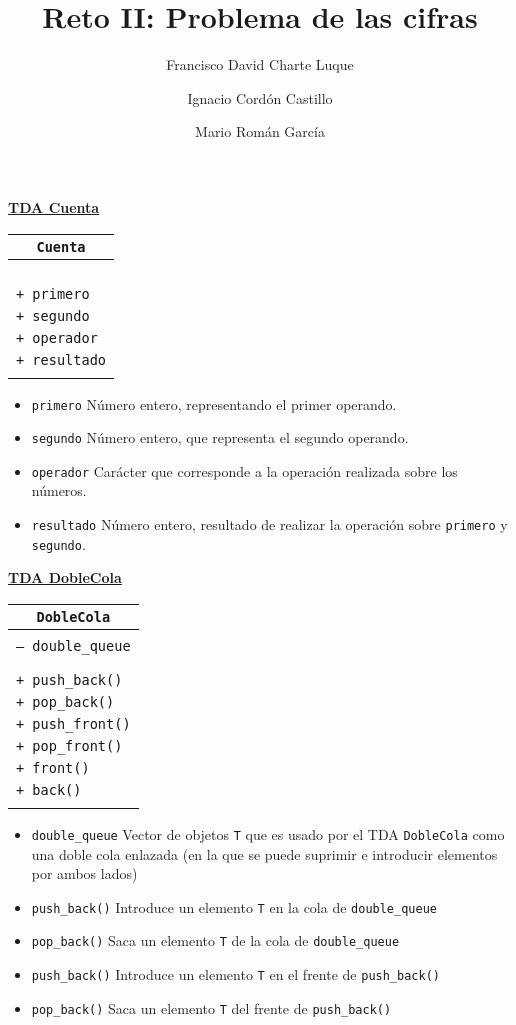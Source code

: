 \documentclass[a4paper,10pt]{scrartcl}
\title{Reto II: Problema de las cifras}
\author{Francisco David Charte Luque \and 
        Ignacio Cordón Castillo \and
        Mario Román García}
\date{}
\newcommand{\objeto}[4]{\noindent\underline{\textbf{TDA #1}}
            \begin{center}\begin{tabular}{|p{7cm}|}
                 \hline
                 \multicolumn{1}{|c|}{\texttt{#1}}\\
                 \hline
                  \\#2\\\\
                 \hline
                 \\#3\\\\
                 \hline
            \end{tabular}\end{center}
            \begin{itemize}
            #4
            \end{itemize}
               }
\def\C++#1{\texttt{#1}}
\def\T_{\texttt{T}}
\begin{document}
\maketitle

\objeto{Cuenta}{}{
        \C++{+ primero}\\
        \C++{+ segundo}\\
        \C++{+ operador}\\
        \C++{+ resultado}
    }{
        \item \C++{primero} Número entero, representando el primer operando.
        \item \C++{segundo} Número entero, que representa el segundo operando.
        \item \C++{operador} Carácter que corresponde a la operación realizada sobre los números.
        \item \C++{resultado} Número entero, resultado de realizar la operación sobre \C++{primero} y \C++{segundo}.
    }


    \objeto{DobleCola}{\C++{-- double\_queue}}
                {\C++{+ push\_back()}\\
                 \C++{+ pop\_back()}\\
                 \C++{+ push\_front()}\\
                 \C++{+ pop\_front()}\\
                 \C++{+ front()}\\
                 \C++{+ back()}}{
 \item \C++{double\_queue} Vector de objetos \T_ que es usado por
  el TDA \C++{DobleCola} como una doble cola enlazada (en la que
  se puede suprimir e introducir elementos por ambos lados)
 \item \C++{push\_back()} Introduce un elemento \T_ en la cola de
  \C++{double\_queue}
 \item \C++{pop\_back()} Saca un elemento \T_ de la cola de 
  \C++{double\_queue}
 \item \C++{push\_back()} Introduce un elemento \T_ en el frente
  de \C++{push\_back()}
 \item \C++{pop\_back()} Saca un elemento \T_ del frente de 
  \C++{push\_back()}}  
  
\end{document}
